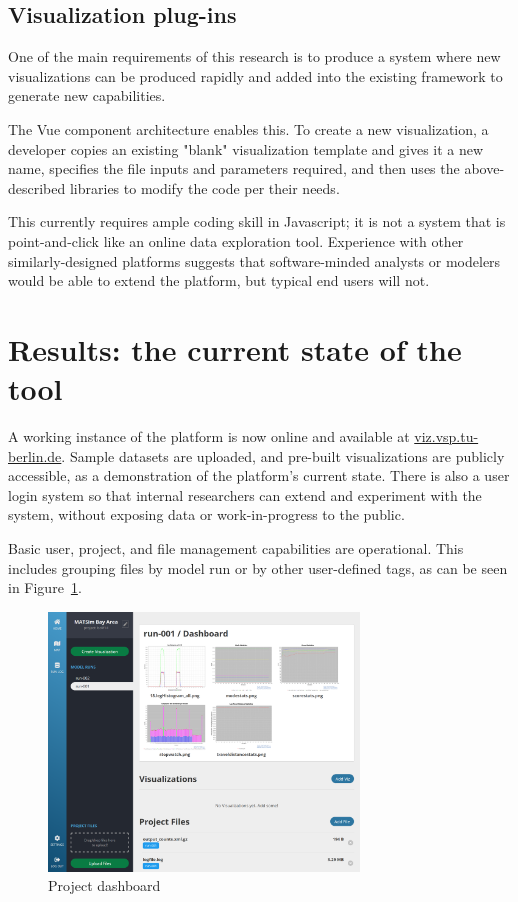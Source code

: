 \documentclass[Afour,sagev,times]{sagej}
\begin{document}
\subsection{Visualization plug-ins}

One of the main requirements of this research is to produce a system where new visualizations can be produced rapidly and added into the existing framework to generate new capabilities.

The Vue component architecture enables this. To create a new visualization, a developer copies an existing "blank" visualization template and gives it a new name, specifies the file inputs and parameters required, and then uses the above-described libraries to modify the code per their needs.

This currently requires ample coding skill in Javascript; it is not a system that is point-and-click like an online data exploration tool. Experience with other similarly-designed platforms suggests that software-minded analysts or modelers would be able to extend the platform, but typical end users will not.

\section{Results: the current state of the tool}

A working instance of the platform is now online and available at \url{viz.vsp.tu-berlin.de}. Sample datasets are uploaded, and pre-built visualizations are publicly accessible, as a demonstration of the platform's current state. There is also a user login system so that internal researchers can extend and experiment with the system, without exposing data or work-in-progress to the public.

Basic user, project, and file management capabilities are operational. This includes grouping files by model run or by other user-defined tags, as can be seen in Figure~\ref{F1}.

\begin{figure}
\centering
\includegraphics[width=3.25in]{fig-1.png}
\caption{Project dashboard}\label{F1}
\end{figure}
\end{document}
